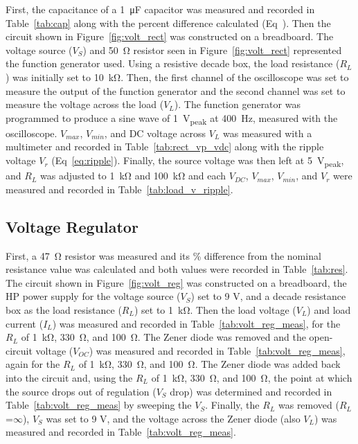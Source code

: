 \documentclass{article}
\begin{document}
First, the capacitance of a \SI{1}{\micro\farad} capacitor was measured and  recorded in Table~\ref{tab:cap} along with the percent difference calculated (Eq~\label{eq:percent_diff}).  Then the circuit shown in Figure~\ref{fig:volt_rect} was constructed on a breadboard. The voltage source ($V_S$) and \SI{50}{\ohm} resistor seen in Figure~\ref{fig:volt_rect} represented the function generator used.  Using a resistive decade box, the load resistance ($R_L$) was initially set to \SI{10}{\kilo\ohm}.  Then, the first channel of the oscilloscope was set to measure the output of the function generator and the second channel was set to measure the voltage across the load ($V_L$).  The function generator was programmed to produce a sine wave of \SI{1}{V_{peak}} at \SI{400}{\hertz}, measured with the oscilloscope.  $V_{max}$, $V_{min}$, and DC voltage across $V_L$ was measured with a multimeter and recorded in Table~\ref{tab:rect_vp_vdc} along with the ripple voltage $V_r$ (Eq~\ref{eq:ripple}).  Finally, the source voltage was then left at \SI{5}{V_{peak}}, and $R_L$ was adjusted to \SI{1}{\kilo\ohm} and \SI{100}{\kilo\ohm} and each $V_{DC}$, $V_{max}$, $V_{min}$, and $V_r$ were measured and recorded in Table~\ref{tab:load_v_ripple}.

\subsection{Voltage Regulator}
\label{sec:volt_reg}

First, a \SI{47}{\ohm} resistor was measured and its \% difference from the nominal resistance value was calculated and both values were recorded in Table~\ref{tab:res}. The circuit shown in Figure~\ref{fig:volt_reg} was constructed on a breadboard, the HP power supply for the voltage source ($V_S$) set to 9 V, and a decade resistance box as the load resistance ($R_L$) set to \SI{1}{\kilo\ohm}. Then the load voltage ($V_L$) and load current ($I_L$) was measured and recorded in Table~\ref{tab:volt_reg_meas}, for the $R_L$ of \SI{1}{\kilo\ohm}, \SI{330}{\ohm}, and \SI{100}{\ohm}. The Zener diode was removed and the open-circuit voltage ($V_{OC}$) was measured and recorded in Table~\ref{tab:volt_reg_meas}, again for the $R_L$ of \SI{1}{\kilo\ohm}, \SI{330}{\ohm}, and \SI{100}{\ohm}. The Zener diode was added back into the circuit and, using the $R_L$ of \SI{1}{\kilo\ohm}, \SI{330}{\ohm}, and \SI{100}{\ohm}, the point at which the source drops out of regulation ($V_S$ drop) was determined and recorded in Table~\ref{tab:volt_reg_meas} by sweeping the $V_S$. Finally, the $R_L$ was removed ($R_L$=$\infty$), $V_S$ was set to 9 V, and the voltage across the Zener diode (also $V_L$) was measured and recorded in Table~\ref{tab:volt_reg_meas}.
\end{document}
